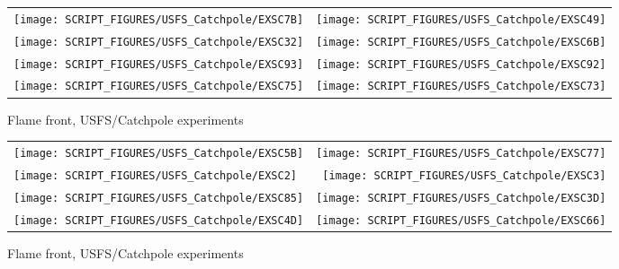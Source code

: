 \begin{figure}[p]
\begin{tabular*}{\textwidth}{l@{\extracolsep{\fill}}r}
\texttt{[image: SCRIPT\_FIGURES/USFS\_Catchpole/EXSC7B]} &
\texttt{[image: SCRIPT\_FIGURES/USFS\_Catchpole/EXSC49]} \\
\texttt{[image: SCRIPT\_FIGURES/USFS\_Catchpole/EXSC32]} &
\texttt{[image: SCRIPT\_FIGURES/USFS\_Catchpole/EXSC6B]} \\
\texttt{[image: SCRIPT\_FIGURES/USFS\_Catchpole/EXSC93]} &
\texttt{[image: SCRIPT\_FIGURES/USFS\_Catchpole/EXSC92]} \\
\texttt{[image: SCRIPT\_FIGURES/USFS\_Catchpole/EXSC75]} &
\texttt{[image: SCRIPT\_FIGURES/USFS\_Catchpole/EXSC73]} \\
\end{tabular*}
\caption[Flame front, USFS/Catchpole experiments]{Flame front, USFS/Catchpole experiments}
\label{USFS_Catchpole_056}
\end{figure}

\begin{figure}[p]
\begin{tabular*}{\textwidth}{l@{\extracolsep{\fill}}r}
\texttt{[image: SCRIPT\_FIGURES/USFS\_Catchpole/EXSC5B]} &
\texttt{[image: SCRIPT\_FIGURES/USFS\_Catchpole/EXSC77]} \\
\texttt{[image: SCRIPT\_FIGURES/USFS\_Catchpole/EXSC2]} &
\texttt{[image: SCRIPT\_FIGURES/USFS\_Catchpole/EXSC3]} \\
\texttt{[image: SCRIPT\_FIGURES/USFS\_Catchpole/EXSC85]} &
\texttt{[image: SCRIPT\_FIGURES/USFS\_Catchpole/EXSC3D]} \\
\texttt{[image: SCRIPT\_FIGURES/USFS\_Catchpole/EXSC4D]} &
\texttt{[image: SCRIPT\_FIGURES/USFS\_Catchpole/EXSC66]} \\
\end{tabular*}
\caption[Flame front, USFS/Catchpole experiments]{Flame front, USFS/Catchpole experiments}
\label{USFS_Catchpole_064}
\end{figure}

